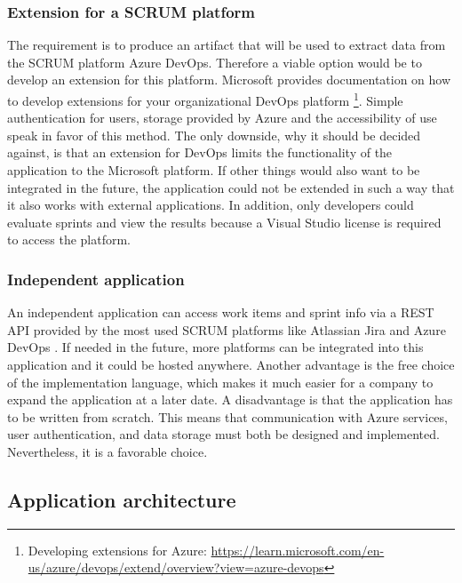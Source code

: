 \subsubsection{Extension for a SCRUM platform}
The requirement is to produce an artifact that will be used to extract 
data from the SCRUM platform Azure DevOps. 
Therefore a viable option would be to develop an extension for this platform.
Microsoft provides documentation on how to develop extensions for your 
organizational DevOps platform \footnote{Developing extensions for Azure: \url{https://learn.microsoft.com/en-us/azure/devops/extend/overview?view=azure-devops}}.
Simple authentication for users, storage provided by Azure and the 
accessibility of use speak in favor of this method.
The only downside, why it should be decided against, is that an extension for 
DevOps limits the functionality of the application to the Microsoft platform. 
If other things would also want to be integrated in the future, 
the application could not be extended in such a way that it 
also works with external applications. 
In addition, only developers could evaluate sprints and view the 
results because a Visual Studio license is required to access the platform.

\subsubsection{Independent application}
An independent application can access work items and sprint info via a REST API provided by the most used SCRUM platforms like Atlassian Jira and Azure DevOps \parencite{TopTenScrum}.
If needed in the future, more platforms can be integrated into this 
application and it could be hosted anywhere. 
Another advantage is the free choice of the implementation language, 
which makes it much easier for a company to expand the application at a later date. 
A disadvantage is that the application has to be written from scratch. 
This means that communication with Azure services, user authentication, 
and data storage must both be designed and implemented. 
Nevertheless, it is a favorable choice.

\subsection{Application architecture}


